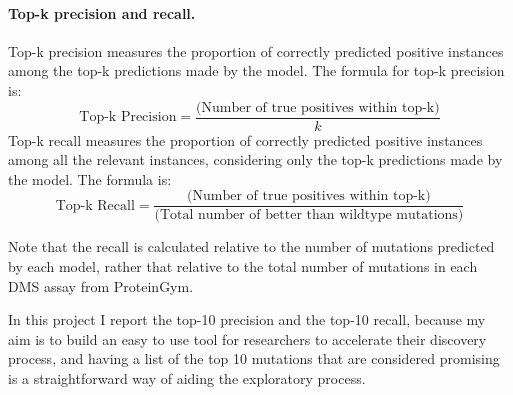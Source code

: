 
\paragraph{Top-k precision and recall.}
Top-k precision measures the proportion of correctly predicted positive instances among the top-k predictions made by the model.
The formula for top-k precision is:
\begin{equation}
\text{Top-k Precision} = \frac{\text{(Number of true positives within top-k)}}{k}
\end{equation}
Top-k recall measures the proportion of correctly predicted positive instances among all the relevant instances, considering only the top-k predictions made by the model. The formula is:
\begin{equation}
    \text{Top-k Recall} = \frac{\text{(Number of true positives within top-k)}}{\text{(Total number of better than wildtype mutations)}}
\end{equation}

Note that the recall is calculated relative to the number of mutations predicted by each model, rather that relative to the total number of mutations in each DMS assay from ProteinGym. 

In this project I report the top-10 precision and the top-10 recall, because my aim is to build an easy to use tool for researchers to accelerate their discovery process, and having a list of the top 10 mutations that are considered promising is a straightforward way of aiding the exploratory process. 

